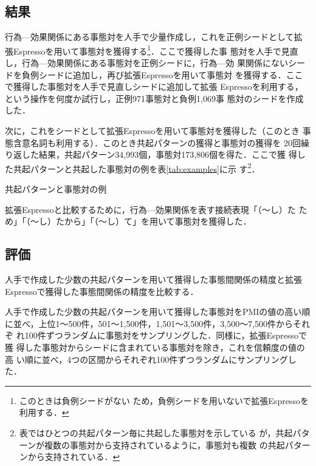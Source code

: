 \documentclass[japanese]{jnlp_1.4}
\begin{document}
\subsection{結果}
\label{ssec:results}

行為—効果関係にある事態対を人手で少量作成し，これを正例シードとして拡
張Espressoを用いて事態対を獲得する\footnote{このときは負例シードがない
  ため，負例シードを用いないで拡張Espressoを利用する．}．ここで獲得した事
態対を人手で見直し，行為—効果関係にある事態対を正例シードに，行為—効
果関係にないシードを負例シードに追加し，再び拡張Espressoを用いて事態対
を獲得する．ここで獲得した事態対を人手で見直しシードに追加して拡張
Espressoを利用する，という操作を何度か試行し，正例971事態対と負例1,069事
態対のシードを作成した．

次に，これをシードとして拡張Espressoを用いて事態対を獲得した（このとき
  事態含意名詞も利用する）．このとき共起パターンの獲得と事態対の獲得を
20回繰り返した結果，共起パターン34,993個，事態対173,806個を得た．ここで獲
得した共起パターンと共起した事態対の例を表\ref{tab:examples}に示
す\footnote{表ではひとつの共起パターン毎に共起した事態対を示している
  が，共起パターンが複数の事態対から支持されているように，事態対も複数
  の共起パターンから支持されている．}．

\begin{table}[tb]
  \caption{共起パターンと事態対の例}
  \label{tab:examples}

\end{table}

拡張Espressoと比較するために，行為—効果関係を表す接続表現「（〜し）た
  ため」「（〜し）たから」「（〜し）て」を用いて事態対を獲得した．

\subsection{評価}

人手で作成した少数の共起パターンを用いて獲得した事態間関係の精度と拡張
Espressoで獲得した事態間関係の精度を比較する．

人手で作成した少数の共起パターンを用いて獲得した事態対をPMIの値の高い順
に並べ，上位1〜500件，501〜1,500件，1,501〜3,500件，3,500〜7,500件からそれぞ
れ100件ずつランダムに事態対をサンプリングした．同様に，拡張Espressoで獲
得した事態対からシードに含まれている事態対を除き，これを信頼度の値の高
い順に並べ，4つの区間からそれぞれ100件ずつランダムにサンプリングした．
\end{document}
